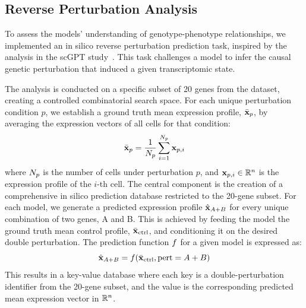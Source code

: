 \subsection{Reverse Perturbation Analysis}
\label{app:metrics:reverse_perturbation}

To assess the models' understanding of genotype-phenotype relationships, we implemented an in silico reverse perturbation prediction task, inspired by the analysis in the scGPT study~\citep{cui2024scgpt}.
This task challenges a model to infer the causal genetic perturbation that induced a given transcriptomic state.

The analysis is conducted on a specific subset of 20 genes from the \citet{norman2019exploring} dataset, creating a controlled combinatorial search space.
For each unique perturbation condition $p$, we establish a ground truth mean expression profile, $\bar{{\mathbf{x}}}_p$, by averaging the expression vectors of all cells for that condition:
\begin{equation}
    \bar{{\mathbf{x}}}_p = \frac{1}{N_p} \sum_{i=1}^{N_p} {\mathbf{x}}_{p,i}
    \label{eq:app:mean_expression}
\end{equation}
where $N_p$ is the number of cells under perturbation $p$, and ${\mathbf{x}}_{p,i} \in \mathbb{R}^n$ is the expression profile of the $i$-th cell.
The central component is the creation of a comprehensive in silico prediction database restricted to the 20-gene subset.
For each model, we generate a predicted expression profile $\hat{{\mathbf{x}}}_{A+B}$ for every unique combination of two genes, A and B.
This is achieved by feeding the model the ground truth mean control profile, $\bar{{\mathbf{x}}}_{\text{ctrl}}$, and conditioning it on the desired double perturbation.
The prediction function $f$ for a given model is expressed as:
\begin{equation}
    \hat{{\mathbf{x}}}_{A+B} = f(\bar{{\mathbf{x}}}_{\text{ctrl}}, \text{pert}=A+B)
    \label{eq:app:prediction_function}
\end{equation}
This results in a key-value database where each key is a double-perturbation identifier from the 20-gene subset, and the value is the corresponding predicted mean expression vector in $\mathbb{R}^n$.

